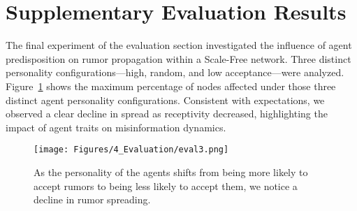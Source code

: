 \section{Supplementary Evaluation Results}

The final experiment of the evaluation section investigated the influence of agent predisposition on rumor propagation within a Scale-Free network.
Three distinct personality configurations—high, random, and low acceptance—were analyzed.
Figure~\ref{fig:eval_3} shows the maximum percentage of nodes affected under those three distinct agent personality configurations.
Consistent with expectations, we observed a clear decline in spread as receptivity decreased, highlighting the impact of agent traits on misinformation dynamics.

\begin{figure}[ht]
    \centering
    \texttt{[image: Figures/4\_Evaluation/eval3.png]}
    \vspace{-2ex}
    \caption{As the personality of the agents shifts from being more likely to accept rumors to being less likely to accept them, we notice a decline in rumor spreading.}
    \vspace{-2ex}
    \label{fig:eval_3}
\end{figure}

